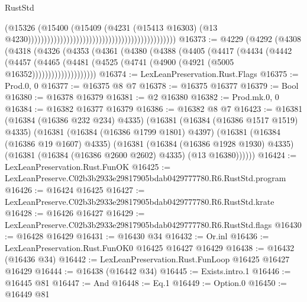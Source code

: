 \begin{lexlean}{RustStd}
\begin{coremodule}
                                                                                      (@15326
                                                                                        (@15400
                                                                                          (@15409
                                                                                            (@4231
                                                                                              (@15413
                                                                                                @16303)
                                                                                              (@13
                                                                                                @4230))))))))))))))))))))))))))))))))))))))))))))))
@16373 := @4229
    (@4292
      (@4308
        (@4318
          (@4326
            (@4353
              (@4361
                (@4380
                  (@4388
                    (@4405
                      (@4417
                        (@4434
                          (@4442
                            (@4457
                              (@4465
                                (@4481 (@4525 (@4741 (@4900 (@4921 (@5005 @16352))))))))))))))))))))
@16374 := LexLeanPreservation.Rust.Flags
@16375 := Prod.{0, 0}
@16377 := @16375 @8 @7
@16378 := @16375 @16377
@16379 := Bool
@16380 := @16378 @16379
@16381 := @2 @16380
@16382 := Prod.mk.{0, 0}
@16384 := @16382 @16377 @16379
@16386 := @16382 @8 @7
@16423 := @16381
    (@16384 (@16386 @232 @234) @4335)
    (@16381
      (@16384 (@16386 @1517 @1519) @4335)
      (@16381
        (@16384 (@16386 @1799 @1801) @4397)
        (@16381
          (@16384 (@16386 @19 @1607) @4335)
          (@16381
            (@16384 (@16386 @1928 @1930) @4335)
            (@16381 (@16384 (@16386 @2600 @2602) @4335) (@13 @16380))))))
@16424 := LexLeanPreservation.Rust.FunOK
@16425 := LexLeanPreserve.C02b3b2933e29817905bdab0429777780.R6.RustStd.program
@16426 := @16424 @16425
@16427 := LexLeanPreserve.C02b3b2933e29817905bdab0429777780.R6.RustStd.krate
@16428 := @16426 @16427
@16429 := LexLeanPreserve.C02b3b2933e29817905bdab0429777780.R6.RustStd.flags
@16430 := @16428 @16429
@16431 := @16430 @34
@16432 := Or.inl
@16436 := LexLeanPreservation.Rust.FunOK0 @16425 @16427 @16429
@16438 := @16432 (@16436 @34)
@16442 := LexLeanPreservation.Rust.FunLoop @16425 @16427 @16429
@16444 := @16438 (@16442 @34)
@16445 := Exists.intro.{1}
@16446 := @16445 @81
@16447 := And
@16448 := Eq.{1}
@16449 := Option.{0}
@16450 := @16449 @81

\end{coremodule}
\end{lexlean}
